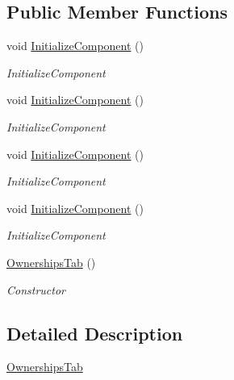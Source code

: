 \subsection*{Public Member Functions}
\begin{DoxyCompactItemize}
\item 
void \hyperlink{class_baudi_1_1_client_1_1_view_1_1_tabs_1_1_ownerships_tab_a9ded0e813104d154882861c92823695c}{Initialize\+Component} ()
\begin{DoxyCompactList}\small\item\em Initialize\+Component \end{DoxyCompactList}\item 
void \hyperlink{class_baudi_1_1_client_1_1_view_1_1_tabs_1_1_ownerships_tab_a9ded0e813104d154882861c92823695c}{Initialize\+Component} ()
\begin{DoxyCompactList}\small\item\em Initialize\+Component \end{DoxyCompactList}\item 
void \hyperlink{class_baudi_1_1_client_1_1_view_1_1_tabs_1_1_ownerships_tab_a9ded0e813104d154882861c92823695c}{Initialize\+Component} ()
\begin{DoxyCompactList}\small\item\em Initialize\+Component \end{DoxyCompactList}\item 
void \hyperlink{class_baudi_1_1_client_1_1_view_1_1_tabs_1_1_ownerships_tab_a9ded0e813104d154882861c92823695c}{Initialize\+Component} ()
\begin{DoxyCompactList}\small\item\em Initialize\+Component \end{DoxyCompactList}\item 
\hyperlink{class_baudi_1_1_client_1_1_view_1_1_tabs_1_1_ownerships_tab_a5f9e0cfeb9a7f48a09600e235d630142}{Ownerships\+Tab} ()
\begin{DoxyCompactList}\small\item\em Constructor \end{DoxyCompactList}\end{DoxyCompactItemize}


\subsection{Detailed Description}
\hyperlink{class_baudi_1_1_client_1_1_view_1_1_tabs_1_1_ownerships_tab}{Ownerships\+Tab} 

